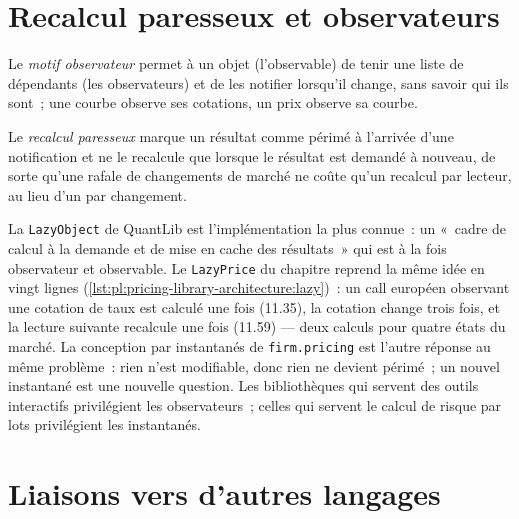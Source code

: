 \section{Recalcul paresseux et observateurs}

\begin{definition}\label{def:pl:pricing-library-architecture:observer}
Le \emph{motif observateur} permet à un objet (l'observable) de tenir une liste de dépendants (les observateurs) et de les notifier
lorsqu'il change, sans savoir qui ils sont~; une courbe observe ses cotations, un prix observe sa courbe.
\end{definition}

\begin{definition}\label{def:pl:pricing-library-architecture:lazy}
Le \emph{recalcul paresseux} marque un résultat comme périmé à l'arrivée d'une notification et ne le recalcule que lorsque le résultat
est demandé à nouveau, de sorte qu'une rafale de changements de marché ne coûte qu'un recalcul par lecteur, au lieu d'un par changement.
\end{definition}

La \texttt{LazyObject} de QuantLib est l'implémentation la plus connue~: un «~cadre de calcul à la demande et de mise en cache des résultats~» qui est à la fois
observateur et observable. Le \texttt{LazyPrice} du chapitre reprend la même idée en vingt lignes
(\cref{lst:pl:pricing-library-architecture:lazy})~: un call européen observant une cotation de taux est calculé une fois (11.35), la cotation change trois
fois, et la lecture suivante recalcule une fois (11.59) --- deux calculs pour quatre états du marché. La conception par instantanés de
\texttt{firm.pricing} est l'autre réponse au même problème~: rien n'est modifiable, donc rien ne devient périmé~; un nouvel instantané est une nouvelle question.
Les bibliothèques qui servent des outils interactifs privilégient les observateurs~; celles qui servent le calcul de risque par lots privilégient les instantanés.

\label{lst:pl:pricing-library-architecture:lazy}

\section{Liaisons vers d'autres langages}

